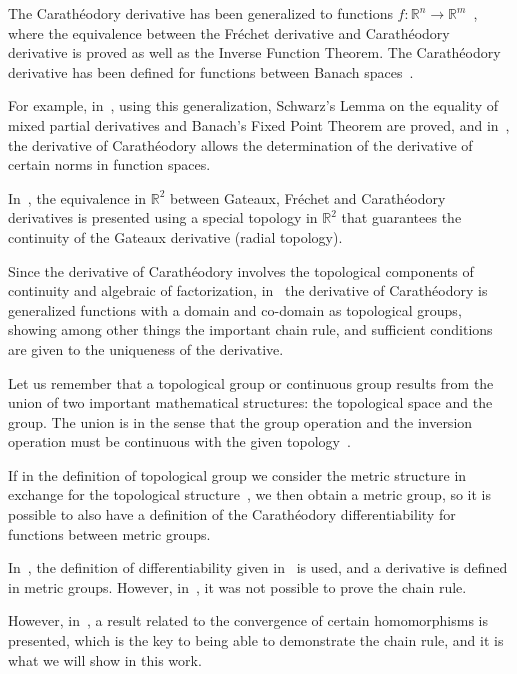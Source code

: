 \documentclass{article}
\numberwithin{theorem}{section}
\numberwithin{equation}{section}
\begin{document}
The Carathéodory derivative has been generalized to functions $f : \mathbb{R}^n \to \mathbb{R}^m$~\cite{acosta1994}, where the equivalence between the Fréchet derivative and Carathéodory derivative is proved as well as the Inverse Function Theorem. The Carathéodory derivative has been defined for functions between Banach spaces~\cite{arora2021, cabrales2006}. 

For example, in~\cite{arora2021}, using this generalization, Schwarz's Lemma on the equality of mixed partial derivatives and Banach's Fixed Point Theorem are proved, and in~\cite{cabrales2006}, the derivative of Carathéodory allows the determination of the derivative of certain norms in function spaces.

In~\cite{pinzon1999}, the equivalence in $\mathbb{R}^2$ between Gateaux, Fréchet and Carathéodory derivatives is presented using a special topology in $\mathbb{R}^2$ that guarantees the continuity of the Gateaux derivative (radial topology). 

Since the derivative of Carathéodory involves the topological components of continuity and algebraic of factorization, in~\cite{acosta1996} the derivative of Carathéodory is generalized functions with a domain and co-domain as topological groups, showing among other things the important chain rule, and sufficient conditions are given to the uniqueness of the derivative.

Let us remember that a topological group or continuous group results from the union of two important mathematical structures: the topological space and the group. The union is in the sense that the group operation and the inversion operation must be continuous with the given topology~\cite{dikranjan2003, pontriaguin1986, spindler1994}.

If in the definition of topological group we consider the metric structure in exchange for the topological structure~\cite{lima1993}, we then obtain a metric group, so it is possible to also have a definition of the Carathéodory differentiability for functions between metric groups. 

In~\cite{granada2006}, the definition of differentiability given in~\cite{acosta1996} is used, and a derivative is defined in metric groups. However, in~\cite{granada2006}, it was not possible to prove the chain rule.

However, in~\cite{granada2007}, a result related to the convergence of certain homomorphisms is presented, which is the key to being able to demonstrate the chain rule, and it is what we will show in this work.
\end{document}

